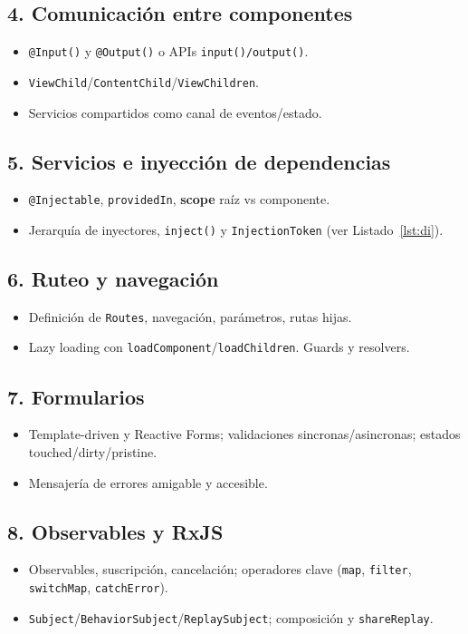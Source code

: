 \documentclass[11pt,a4paper]{article}
\begin{document}
\subsection{4. Comunicación entre componentes}
\begin{itemize}[leftmargin=*]
  \item \texttt{@Input()} y \texttt{@Output()} o APIs \texttt{input()/output()}.
  \item \texttt{ViewChild}/\texttt{ContentChild}/\texttt{ViewChildren}.
  \item Servicios compartidos como canal de eventos/estado.
\end{itemize}

\subsection{5. Servicios e inyección de dependencias}
\begin{itemize}[leftmargin=*]
  \item \texttt{@Injectable}, \texttt{providedIn}, \textbf{scope} raíz vs componente.
  \item Jerarquía de inyectores, \texttt{inject()} y \texttt{InjectionToken} (ver Listado~\ref{lst:di}).
\end{itemize}

\subsection{6. Ruteo y navegación}
\begin{itemize}[leftmargin=*]
  \item Definición de \texttt{Routes}, navegación, parámetros, rutas hijas.
  \item Lazy loading con \texttt{loadComponent}/\texttt{loadChildren}. Guards y resolvers.
\end{itemize}

\subsection{7. Formularios}
\begin{itemize}[leftmargin=*]
  \item Template-driven y Reactive Forms; validaciones sincronas/asincronas; estados touched/dirty/pristine.
  \item Mensajería de errores amigable y accesible.
\end{itemize}

\subsection{8. Observables y RxJS}
\begin{itemize}[leftmargin=*]
  \item Observables, suscripción, cancelación; operadores clave (\texttt{map}, \texttt{filter}, \texttt{switchMap}, \texttt{catchError}).
  \item \texttt{Subject}/\texttt{BehaviorSubject}/\texttt{ReplaySubject}; composición y \texttt{shareReplay}.
\end{itemize}
\end{document}
